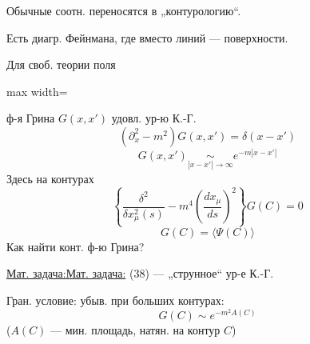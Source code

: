 \documentclass[11pt]{article}
\theoremstyle{definition}
\theoremstyle{remark}
\let\DiplomaticMathUnderline\underline
\renewcommand{\underline}[1]{\ifmmode\DiplomaticMathUnderline{#1}\else\uline{#1}\fi}
\begin{document}
Обычные соотн. переносятся в „контурологию“.

Есть диагр. Фейнмана, где вместо линий — поверхности.

Для своб. теории поля
\begin{adjustbox}{max width=\linewidth}
\end{adjustbox}
ф-я Грина $G(x,x')$
удовл. ур-ю К.-Г.
\begin{equation*}
(\partial_x^2-m^2)G(x,x')=\delta(x-x')
\tag{36}
\end{equation*}
\begin{equation*}
G(x,x')\underset{|x-x'|\to\infty}{\sim}e^{-m|x-x'|}
\tag{37}
\end{equation*}
Здесь на контурах
\begin{equation*}
\left\{\frac{\delta^2}{\delta x_\mu^2(s)}-m^4\left(\frac{dx_\mu}{ds}\right)^2\right\}G(C)=0
\tag{38}
\end{equation*}
\begin{equation*}
G(C)=\langle\Psi(C)\rangle
\tag{39}
\end{equation*}
Как найти конт. ф-ю Грина?

\underline{Мат. задача:} (38) — „струнное“ ур-е К.-Г.

Гран. условие: убыв. при больших контурах:
\begin{equation*}
G(C)\sim e^{-m^2A(C)}
\tag{40}
\end{equation*}
($A(C)$ — мин. площадь, натян. на контур $C$)
\end{document}

